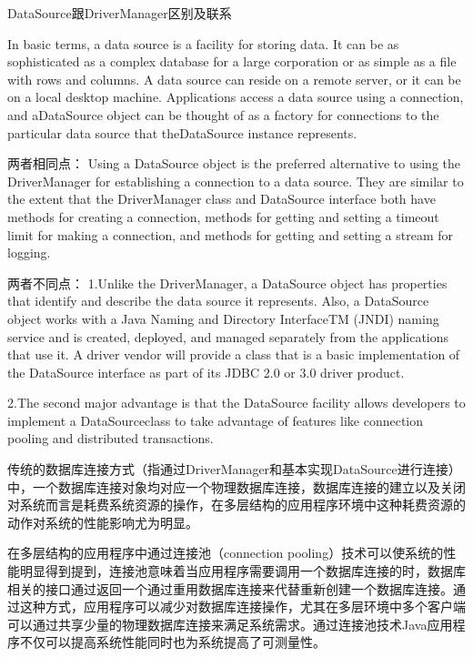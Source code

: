 \documentclass[12pt]{book}
\makeatletter
\numberwithin{dummy}{section}
\theoremstyle{ocrenumbox}
\theoremstyle{blacknumex}
\theoremstyle{blacknumbox}
\theoremstyle{ocrenum}
\renewcommand\paragraph{\@startsection{paragraph}{4}{\z@}
	{-2ex \@plus-.2ex \@minus .2ex}
	{.1ex}
	{\normalfont\small\sffamily\bfseries}}
\makeatother
\begin{document}
\paragraph{DataSource跟DriverManager区别及联系}

In basic terms, a data source is a facility for storing data. It can be as sophisticated as a complex database for a large corporation or as simple as a file with rows and columns. A data source can reside on a remote server, or it can be on a local desktop machine. Applications access a data source using a connection, and aDataSource object can be thought of as a factory for connections to the particular data source that theDataSource instance represents.

两者相同点：
Using a DataSource object is the preferred alternative to using the DriverManager for establishing a connection to a data source. They are similar to the extent that the DriverManager class and DataSource interface both have methods for creating a connection, methods for getting and setting a timeout limit for making a connection, and methods for getting and setting a stream for logging.

两者不同点：
1.Unlike the DriverManager, a DataSource object has properties that identify and describe the data source it represents. Also, a DataSource object works with a Java Naming and Directory InterfaceTM (JNDI) naming service and is created, deployed, and managed separately from the applications that use it. A driver vendor will provide a class that is a basic implementation of the DataSource interface as part of its JDBC 2.0 or 3.0 driver product.

2.The second major advantage is that the DataSource facility allows developers to implement a DataSourceclass to take advantage of features like connection pooling and distributed transactions.

传统的数据库连接方式（指通过DriverManager和基本实现DataSource进行连接）中，一个数据库连接对象均对应一个物理数据库连接，数据库连接的建立以及关闭对系统而言是耗费系统资源的操作，在多层结构的应用程序环境中这种耗费资源的动作对系统的性能影响尤为明显。

在多层结构的应用程序中通过连接池（connection pooling）技术可以使系统的性能明显得到提到，连接池意味着当应用程序需要调用一个数据库连接的时，数据库相关的接口通过返回一个通过重用数据库连接来代替重新创建一个数据库连接。通过这种方式，应用程序可以减少对数据库连接操作，尤其在多层环境中多个客户端可以通过共享少量的物理数据库连接来满足系统需求。通过连接池技术Java应用程序不仅可以提高系统性能同时也为系统提高了可测量性。
\end{document}
